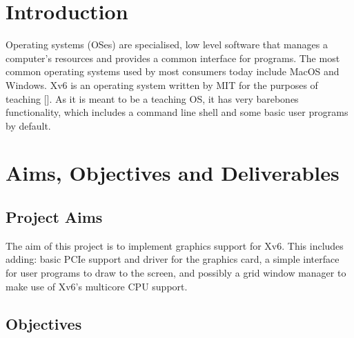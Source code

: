 %
%
\section{Introduction}

Operating systems (OSes) are specialised, low level software that manages a computer's
resources and provides a common interface for programs. The most common operating
systems used by most consumers today include MacOS and Windows. Xv6 is an operating
system written by MIT for the purposes of teaching [\iffalse TODO: add ref \fi].
As it is meant to be a teaching OS, it has very barebones functionality,
which includes a command line shell and some basic user programs by default.


%
%
\section{Aims, Objectives and Deliverables}

\subsection{Project Aims}

The aim of this project is to implement graphics support for Xv6. This includes
adding: basic PCIe support and driver for the graphics card, a simple interface
for user programs to draw to the screen, and possibly a grid window manager
to make use of Xv6's multicore CPU support.

\subsection{Objectives}

